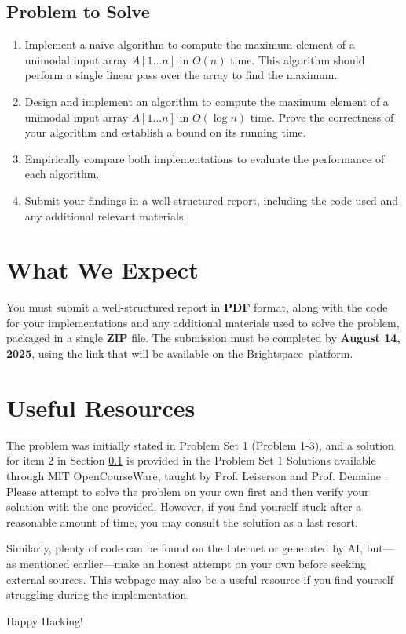 \documentclass{article}
\begin{document}
\subsection{Problem to Solve}\label{sec:problem}
\begin{enumerate}
    \item Implement a naive algorithm to compute the maximum element of a unimodal input array $A[1 \ldots n]$ in $O(n)$ time. This algorithm should perform a single linear pass over the array to find the maximum.
    \item Design and implement an algorithm to compute the maximum element of a unimodal input array $A[1 \ldots n]$ in $O(\log n)$ time. Prove the correctness of your algorithm and establish a bound on its running time.
    \item Empirically compare both implementations to evaluate the performance of each algorithm.
    \item Submit your findings in a well-structured report, including the code used and any additional relevant materials.
\end{enumerate}

\section{What We Expect}
You must submit a well-structured report in \textbf{PDF} format, along with the code for your implementations and any additional materials used to solve the problem, packaged in a single \textbf{ZIP} file. The submission must be completed by \textbf{August 14, 2025}, using the link that will be available on the Brightspace\texttrademark\ platform.

\section{Useful Resources}
The problem was initially stated in Problem Set 1 (Problem 1-3), and a solution for item 2 in Section \ref{sec:problem} is provided in the Problem Set 1 Solutions available through MIT OpenCourseWare, taught by Prof. Leiserson and Prof. Demaine \cite{leiserson1:2005, leiserson2:2005}. Please attempt to solve the problem on your own first and then verify your solution with the one provided. However, if you find yourself stuck after a reasonable amount of time, you may consult the solution as a last resort.

Similarly, plenty of code can be found on the Internet or generated by AI, but—as mentioned earlier—make an honest attempt on your own before seeking external sources. This webpage \cite{gfg:2023} may also be a useful resource if you find yourself struggling during the implementation.

\vspace{5mm}
Happy Hacking! 



\end{document}
